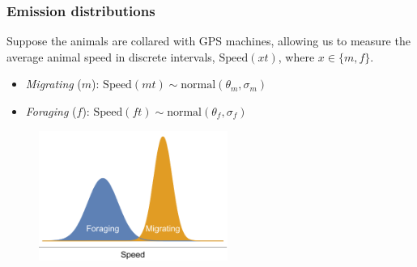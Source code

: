 \documentclass{beamer}
\begin{document}
\begin{frame}
\frametitle{Emission distributions}
Suppose the animals are collared with GPS machines, allowing us to measure the average animal speed in discrete intervals, $\text{Speed}(xt)$, where $x\in\{m,f\}$.

\vspace{0.5cm}

\begin{itemize}
    \item \textit{Migrating} ($m$): $\text{Speed}(mt)\sim \text{normal}(\theta_m,\sigma_m)$
    \item \textit{Foraging} ($f$): $\text{Speed}(ft)\sim \text{normal}(\theta_f,\sigma_f)$
\end{itemize}

\begin{figure}
    \centering
    \includegraphics[width=0.55\textwidth]{figures/foraging_migrating.pdf}
\end{figure}
    
\end{frame}
\end{document}
